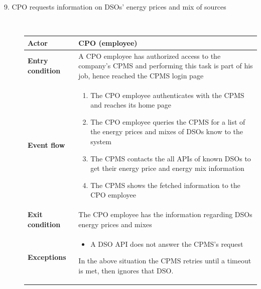 \documentclass[11pt]{article}
\begin{document}
\begin{description}
    \item [9. CPO requests information on DSOs’ energy prices and mix of sources] \hfill \\
    \begin{table}[H]
        \centering
        \setlength{\tabcolsep}{18pt}
        \renewcommand{\arraystretch}{1.4}
        \begin{tabularx}{\textwidth}{|>{\hsize=0.5\hsize}X|>{\hsize=1.5\hsize}X|}
            \hline
            \textbf{Actor} & CPO (employee) \\
            \hline
            \textbf{Entry condition} & A CPO employee has authorized access to the company's CPMS and performing this task is part of his job, hence reached the CPMS login page \\
            \hline
            \textbf{Event flow} & 
                \begin{minipage}[t]{\hsize}
                \begin{enumerate}[topsep=0pt, leftmargin=*]
                    \item The CPO employee authenticates with the CPMS and reaches its home page
                    \item The CPO employee queries the CPMS for a list of the energy prices and mixes of DSOs know to the system
                    \item The CPMS contacts the all APIs of known DSOs to get their energy price and energy mix information
                    \item The CPMS shows the fetched information to the CPO employee
                \end{enumerate}
                \end{minipage}
                \vspace{6pt}
            \\
            \hline
            \textbf{Exit condition} & The CPO employee has the information regarding DSOs energy prices and mixes \\
            \hline
            \textbf{Exceptions} & 
                \begin{minipage}[t]{\hsize}
                \vspace{0pt}
                \begin{itemize}[topsep=0pt, leftmargin=*]
                    \item A DSO API does not answer the CPMS's request
                \end{itemize}
                \vspace{8pt}
                \end{minipage}
                In the above situation the CPMS retries until a timeout is met, then ignores that DSO.
                \vspace{6pt}
            \\
            \hline
        \end{tabularx}
    \end{table}
    

\end{description}
\end{document}
